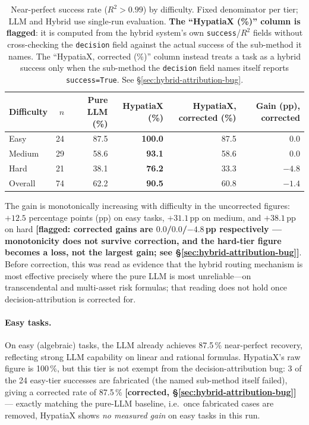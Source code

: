 \documentclass[twoside,11pt]{article}
\newcommand{\Rsq}{R^{2}}
\begin{document}
\begin{table}[h]
\centering
\caption{Near-perfect success rate ($\Rsq > 0.99$) by difficulty.
Fixed denominator per tier; LLM and Hybrid use single-run evaluation.
\textbf{The ``HypatiaX (\%)'' column is flagged}: it is computed from the
hybrid system's own \texttt{success}/$\Rsq$ fields without cross-checking the
\texttt{decision} field against the actual success of the sub-method it
names. The ``HypatiaX, corrected (\%)'' column instead treats a task as a
hybrid success only when the sub-method the \texttt{decision} field names
itself reports \texttt{success=True}. See \S\ref{sec:hybrid-attribution-bug}.}
\label{tab:difficulty}
\begin{tabular}{lrrrrr}
\toprule
Difficulty & $n$ & Pure LLM (\%) & HypatiaX (\%) & HypatiaX, corrected (\%) & Gain (pp), corrected \\
\midrule
Easy       & 24  & 87.5          & \textbf{100.0} & 87.5 & $0.0$ \\
Medium     & 29  & 58.6          & \textbf{93.1}  & 58.6 & $0.0$ \\
Hard       & 21  & 38.1          & \textbf{76.2}  & 33.3 & $-4.8$ \\
\midrule
Overall    & 74  & 62.2          & \textbf{90.5}  & 60.8 & $-1.4$ \\
\bottomrule
\end{tabular}
\end{table}

The gain is monotonically increasing with difficulty in the uncorrected figures:
$+12.5$ percentage points (pp) on easy tasks, $+31.1$\,pp on medium, and $+38.1$\,pp
on hard \textbf{[flagged: corrected gains are $0.0$/$0.0$/$-4.8$\,pp respectively
--- monotonicity does not survive correction, and the hard-tier figure becomes a
loss, not the largest gain; see \S\ref{sec:hybrid-attribution-bug}]}. Before
correction, this was read as evidence that
the hybrid routing mechanism is most effective precisely where the pure LLM is most
unreliable---on transcendental and multi-asset risk formulas; that reading does
not hold once decision-attribution is corrected for.

\paragraph{Easy tasks.}
On easy (algebraic) tasks, the LLM already achieves 87.5\,\% near-perfect recovery,
reflecting strong LLM capability on linear and rational formulas.  HypatiaX's
raw figure is 100\,\%, but this tier is not exempt from the decision-attribution
bug: 3 of the 24 easy-tier successes are fabricated (the named sub-method
itself failed), giving a corrected rate of 87.5\,\%
\textbf{[corrected, \S\ref{sec:hybrid-attribution-bug}]} --- exactly matching
the pure-LLM baseline, i.e.\ once fabricated cases are removed, HypatiaX shows
\emph{no measured gain} on easy tasks in this run.
\end{document}
